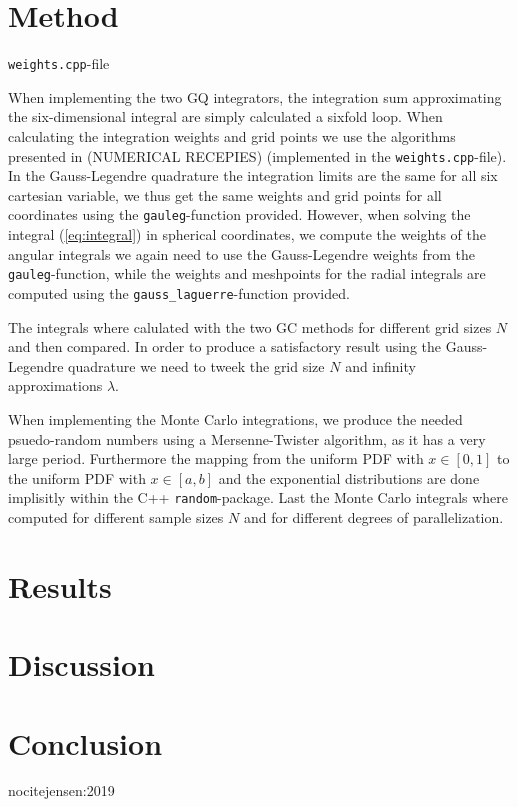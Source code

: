 \documentclass[twocolumn]{aastex62}
\begin{document}
\section{Method} \label{sec:method}
\texttt{weights.cpp}-file

When implementing the two GQ integrators, the integration sum approximating the six-dimensional integral are simply calculated a sixfold loop. When calculating the integration weights and grid points we use the algorithms presented in (NUMERICAL RECEPIES) (implemented in the \texttt{weights.cpp}-file). In the Gauss-Legendre quadrature the integration limits are the same for all six cartesian variable, we thus get the same weights and grid points for all coordinates using the \texttt{gauleg}-function provided. However, when solving the integral (\ref{eq:integral}) in spherical coordinates, we compute the weights of the angular integrals we again need to use the Gauss-Legendre weights from the \texttt{gauleg}-function, while the weights and meshpoints for the radial integrals are computed using the \texttt{gauss_laguerre}-function provided.

The integrals where calulated with the two GC methods for different grid sizes  $N$ and then compared. In order to produce a satisfactory result using the Gauss-Legendre quadrature we need to tweek the grid size $N$ and infinity approximations $\lambda$.

When implementing the Monte Carlo integrations, we produce the needed psuedo-random numbers using a Mersenne-Twister algorithm, as it has a very large period. Furthermore the mapping from the uniform PDF with $x\in[0,1]$ to the uniform PDF with $x\in[a,b]$ and the exponential distributions are done implisitly within the C++ \texttt{random}-package. Last the Monte Carlo integrals where computed for different sample sizes $N$ and for different degrees of parallelization. 

\section{Results} \label{sec:results}
\section{Discussion} \label{sec:discussion}
\section{Conclusion} \label{sec:conclusion}

nocite{jensen:2019}


\end{document}
